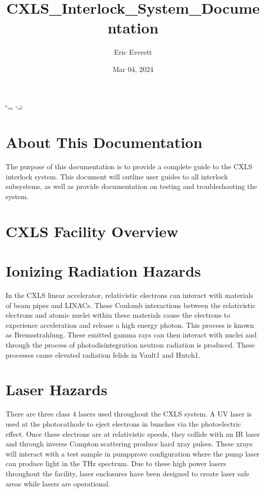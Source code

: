 \documentclass[letterpaper,10pt,english]{sphinxmanual}
\title{CXLS_Interlock_System_Documentation}
\date{Mar 04, 2024}
\author{Eric Everett}
\begin{document}
\ifdefined\shorthandoff
  \ifnum\catcode`\=\string=\active\shorthandoff{=}\fi
  \ifnum\catcode`\"=\active{}\fi
\fi

\pagestyle{empty}
\sphinxmaketitle
\pagestyle{plain}
\sphinxtableofcontents
\pagestyle{normal}
\label{\detokenize{index::doc}}



\chapter{About This Documentation}
\label{\detokenize{index:about-this-documentation}}
\sphinxAtStartPar
The purpose of this documentation is to provide a complete guide to the CXLS interlock system.
This document will outline user guides to all interlock subsystems, as well as provide documentation on testing and troubleshooting the system.


\chapter{CXLS Facility Overview}
\label{\detokenize{index:cxls-facility-overview}}

\sphinxAtStartPar



\chapter{Ionizing Radiation Hazards}
\label{\detokenize{index:ionizing-radiation-hazards}}
\sphinxAtStartPar
In the CXLS linear accelerator, relativistic electrons can interact with materials of beam pipes and LINACs.
These Coulomb interactions between the relativistic electrons and atomic nuclei within these materials cause the electrons to experience acceleration and release a high energy photon.
This process is known as Bremsstrahlung. These emitted gamma rays can then interact with nuclei and through the process of photodisintegration neutron radiation is produced.
These processes cause elevated radiation felids in Vault\sphinxhyphen{}1 and Hutch\sphinxhyphen{}1.


\chapter{Laser Hazards}
\label{\detokenize{index:laser-hazards}}
\sphinxAtStartPar
There are three class 4 lasers used throughout the CXLS system.
A UV laser is used at the photocathode to eject electrons in bunches via the photoelectric effect.
Once these electrons are at relativistic speeds, they collide with an IR laser and through inverse Compton scattering produce hard x\sphinxhyphen{}ray pulses.
These x\sphinxhyphen{}rays will interact with a test sample in pump\sphinxhyphen{}prove configuration where the pump laser can produce light in the THz spectrum.
Due to these high power lasers throughout the facility, laser enclosures have been designed to create laser safe areas while lasers are operational.
\end{document}
